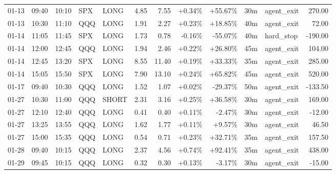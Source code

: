 \documentclass[11pt,a4paper,twoside]{article}
\begin{document}
\begin{center}
\begin{longtable}{>{\color{txtmain}}l l l l l r r r r r >{\color{txtmain}}l r}
01-13 & 09:40 & 10:10 & SPX & LONG & 4.85 & 7.55 & \textcolor{wingreen}{+0.34\%} & \textcolor{wingreen}{+55.67\%} & 30m & agent\_exit & \textcolor{wingreen}{270.00} \\
01-13 & 10:30 & 11:10 & QQQ & LONG & 1.91 & 2.27 & \textcolor{wingreen}{+0.23\%} & \textcolor{wingreen}{+18.85\%} & 40m & agent\_exit & \textcolor{wingreen}{72.00} \\
01-14 & 11:05 & 11:45 & SPX & LONG & 1.73 & 0.78 & \textcolor{lossred}{-0.16\%} & \textcolor{lossred}{-55.07\%} & 40m & hard\_stop & \textcolor{lossred}{-190.00} \\
01-14 & 12:00 & 12:45 & QQQ & LONG & 1.94 & 2.46 & \textcolor{wingreen}{+0.22\%} & \textcolor{wingreen}{+26.80\%} & 45m & agent\_exit & \textcolor{wingreen}{104.00} \\
01-14 & 12:45 & 13:20 & SPX & LONG & 8.55 & 11.40 & \textcolor{wingreen}{+0.19\%} & \textcolor{wingreen}{+33.33\%} & 35m & agent\_exit & \textcolor{wingreen}{285.00} \\
01-14 & 15:05 & 15:50 & SPX & LONG & 7.90 & 13.10 & \textcolor{wingreen}{+0.24\%} & \textcolor{wingreen}{+65.82\%} & 45m & agent\_exit & \textcolor{wingreen}{520.00} \\
01-17 & 09:40 & 10:30 & QQQ & LONG & 1.52 & 1.07 & \textcolor{wingreen}{+0.02\%} & \textcolor{lossred}{-29.37\%} & 50m & agent\_exit & \textcolor{lossred}{-133.50} \\
01-27 & 10:30 & 11:00 & QQQ & SHORT & 2.31 & 3.16 & \textcolor{wingreen}{+0.25\%} & \textcolor{wingreen}{+36.58\%} & 30m & agent\_exit & \textcolor{wingreen}{169.00} \\
01-27 & 12:10 & 12:40 & QQQ & LONG & 0.41 & 0.40 & \textcolor{wingreen}{+0.11\%} & \textcolor{lossred}{-2.47\%} & 30m & agent\_exit & \textcolor{lossred}{-12.00} \\
01-27 & 13:25 & 13:55 & QQQ & LONG & 1.62 & 1.77 & \textcolor{wingreen}{+0.11\%} & \textcolor{wingreen}{+9.57\%} & 30m & agent\_exit & \textcolor{wingreen}{46.50} \\
01-27 & 15:00 & 15:35 & QQQ & LONG & 0.54 & 0.71 & \textcolor{wingreen}{+0.23\%} & \textcolor{wingreen}{+32.71\%} & 35m & agent\_exit & \textcolor{wingreen}{157.50} \\
01-28 & 09:40 & 10:15 & QQQ & LONG & 2.37 & 4.56 & \textcolor{wingreen}{+0.74\%} & \textcolor{wingreen}{+92.41\%} & 35m & agent\_exit & \textcolor{wingreen}{438.00} \\
01-29 & 09:45 & 10:15 & QQQ & LONG & 0.32 & 0.30 & \textcolor{wingreen}{+0.13\%} & \textcolor{lossred}{-3.17\%} & 30m & agent\_exit & \textcolor{lossred}{-15.00} \\

\end{longtable}
\end{center}
\end{document}
